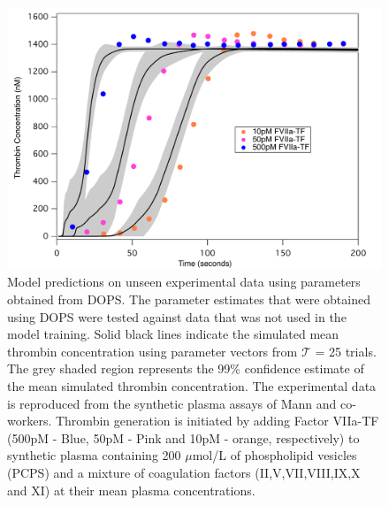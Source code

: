 \documentclass[12pt]{article}
\begin{document}
\begin{figure}[h]
\centering
\includegraphics[width=1.0\textwidth]{./figs/Figure_6_Sim_Validate_E2_E4_E6.pdf}
\caption{Model predictions on unseen experimental data using parameters obtained from DOPS. The parameter estimates that were obtained using DOPS were tested against data that was not used in the model training. Solid black lines indicate the simulated mean thrombin concentration using parameter vectors from $\mathcal{T}$ = 25 trials. The grey shaded region represents the 99\% confidence estimate of the mean simulated thrombin concentration. The experimental data is reproduced from the synthetic plasma assays of Mann and co-workers. Thrombin generation is initiated by adding Factor VIIa-TF (500pM - Blue, 50pM - Pink and 10pM - orange, respectively) to synthetic plasma containing 200 $\mu$mol/L of phospholipid vesicles (PCPS) and a mixture of coagulation factors (II,V,VII,VIII,IX,X and XI) at their mean plasma concentrations.
}\label{fig-validation}
\end{figure}

\clearpage
\end{document}
